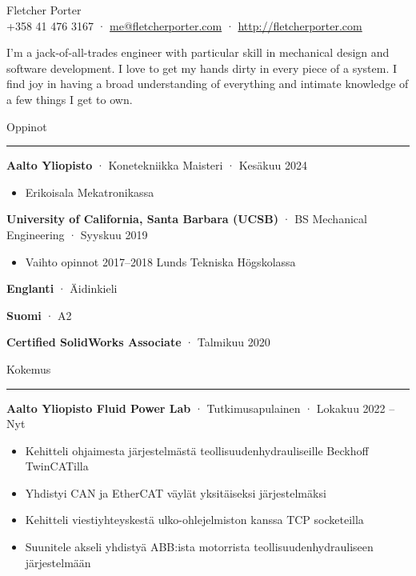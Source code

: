 \documentclass[12pt, oneside]{article}
\newcommand{\titlestyle}[1] {
	{\fontsize{40pt}{1em}\selectfont \textcolor{new_red}{\textsf{#1}}} \\
}
\newcommand{\headingstyleJobs}[1] {
	{\fontsize{18pt}{1em}\selectfont \textcolor{new_red}{\textsf{#1}}}
	\textcolor{new_red}{\rule{3.25in}{0.5pt}} \vspace{3pt}
}
\newcommand{\infostyle}[1] {
	{\selectfont #1} \\ %
}
\newcommand{\jobtitle}[3] {
	{\bf #1} · {#2} · {#3} \vspace{-7pt} \\
}
\newcommand{\certification}[2] {
	{\bf #1} · {#2}
}
\renewenvironment{quote}{%
  \list{}{%
    \leftmargin4pt
    \rightmargin\leftmargin
  }
  \item\relax
}
{\endlist}
\newcommand{\overview}[1] {
	\begin{quote}
		#1
	\end{quote}
}
\begin{document}
\begin{flushleft}



\titlestyle{Fletcher Porter}
\infostyle{+358 41 476 3167 · \href{mailto:me@fletcherporter.com}{me@fletcherporter.com} · \url{http://fletcherporter.com}}

\overview{
I'm a jack-of-all-trades engineer with particular skill in mechanical design and software
development.  I love to get my hands dirty in every piece
of a system.  I find joy in having a broad understanding of everything and
intimate knowledge of a few things I get to own.
}

\headingstyleJobs{Oppinot}

\jobtitle{Aalto Yliopisto}{Konetekniikka Maisteri}{Kesäkuu 2024}
\begin{itemize}
    \item Erikoisala Mekatronikassa
\end{itemize}

\jobtitle{University of California, Santa Barbara (UCSB)}{BS Mechanical Engineering}{Syyskuu 2019}
\begin{itemize}
	\item Vaihto opinnot 2017–2018 Lunds Tekniska Högskolassa \\
\end{itemize}


\certification{Englanti}{Äidinkieli} \certification{Suomi}{A2} \vspace{5pt}

\certification{Certified SolidWorks Associate}{Talmikuu 2020} \vspace{5pt}


\headingstyleJobs{Kokemus}

\jobtitle{Aalto Yliopisto Fluid Power Lab}{Tutkimusapulainen}{Lokakuu 2022 – Nyt}
\begin{itemize}
	\item Kehitteli ohjaimesta järjestelmästä teollisuudenhydrauliseille Beckhoff TwinCATilla \\
	\item Yhdistyi CAN ja EtherCAT väylät yksitäiseksi järjestelmäksi \\
	\item Kehitteli viestiyhteyskestä ulko-ohlejelmiston kanssa TCP socketeilla \\
	\item Suunitele akseli yhdistyä ABB:ista motorrista teollisuudenhydrauliseen järjestelmään
\end{itemize}


\end{flushleft}
\end{document}
